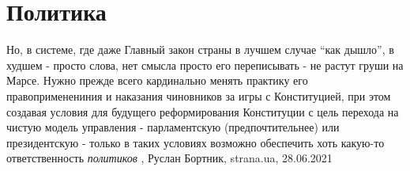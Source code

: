  
 
 
 
 
\chapter{Политика}
\label{sec:slova.politika}

Но, в системе, где даже Главный закон страны в лучшем случае \enquote{как дышло}, в
худшем - просто слова, нет смысла просто его переписывать - не растут груши на
Марсе. Нужно прежде всего кардинально менять практику его правоприменениния и
наказания чиновников за игры с Конституцией, при этом создавая условия для
будущего реформирования Конституции с цель перехода на чистую модель управления
- парламентскую (предпочтительнее) или президентскую - только в таких условиях
возможно обеспечить хоть какую-то ответственность \emph{политиков}
, 
Руслан Бортник, strana.ua, 28.06.2021
